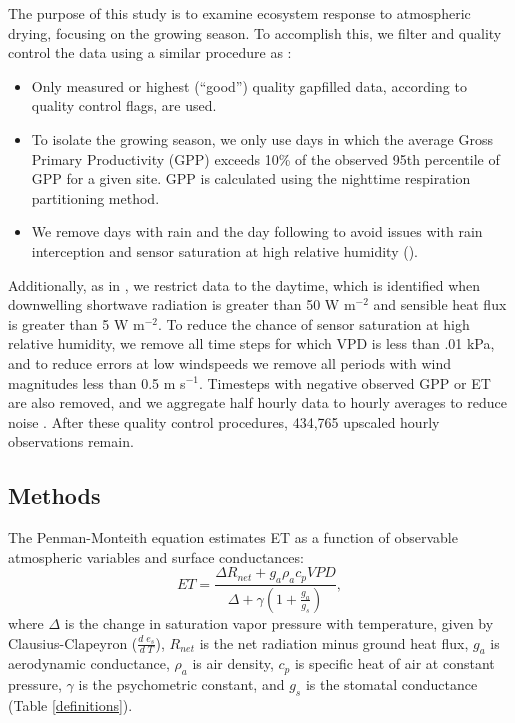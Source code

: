 The purpose of this study is to examine ecosystem response to
atmospheric drying, focusing on the growing season. To accomplish
this, we filter and quality control the data using a similar procedure
as \cite{Zhou_2015}:
\begin{itemize}
\item Only measured or highest (``good'') quality gapfilled data,
  according to quality control flags, are used.
\item To isolate the growing season, we only use days in which the
  average Gross Primary Productivity (GPP) exceeds 10\% of the
  observed 95th percentile of GPP for a given site. GPP is calculated
  using the nighttime respiration partitioning method.
\item We remove days with rain and the day following to avoid issues
  with rain interception and sensor saturation at high relative
  humidity (\cite{Medlyn_2017}).
\end{itemize}
Additionally, as in \citet{Lin_2018}, we restrict data to the daytime,
which is identified when downwelling shortwave radiation is greater
than 50 W m$^{-2}$ and sensible heat flux is greater than 5 W
m$^{-2}$. To reduce the chance of sensor saturation at high relative
humidity, we remove all time steps for which VPD is less than .01 kPa,
and to reduce errors at low windspeeds we remove all periods with wind
magnitudes less than 0.5 m s$^{-1}$. Timesteps with negative observed
GPP or ET are also removed, and we aggregate half hourly data to
hourly averages to reduce noise \citep{Lin_2018}. After these quality
control procedures, 434,765 upscaled hourly observations remain.

\subsection{Methods}
\label{methods}
The Penman-Monteith equation \citep [hereafter PM,][]{Penman_1948,
  Monteith_1965} estimates ET as a function of observable atmospheric
variables and surface conductances:
  \begin{equation}
    \label{orig_pen}
    ET = \frac{\Delta R_{net} + g_a \rho_a c_p VPD}{\Delta + \gamma(1 + \frac{g_a}{g_s})},
  \end{equation}
where $\Delta$ is the change in saturation vapor pressure with
temperature, given by Clausius-Clapeyron ($\frac{d \; e_s}{d \; T}$),
$R_{net}$ is the net radiation minus ground heat flux, $g_a$ is
aerodynamic conductance, $\rho_a$ is air density, $c_p$ is specific
heat of air at constant pressure, $\gamma$ is the psychometric
constant, and $g_s$ is the stomatal conductance (Table
\ref{definitions}).


